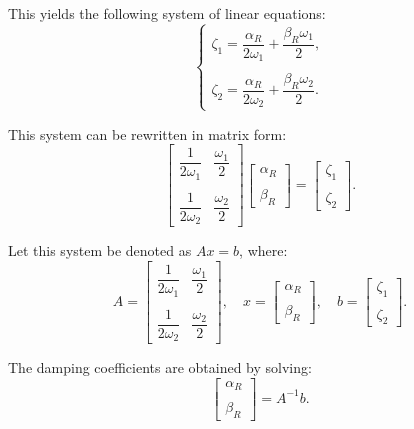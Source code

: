 \documentclass{article}
\begin{document}
	This yields the following system of linear equations:
	\[
	\begin{cases}
		\zeta_1 = \dfrac{\alpha_R}{2\omega_1} + \dfrac{\beta_R \omega_1}{2}, \\\\
		\zeta_2 = \dfrac{\alpha_R}{2\omega_2} + \dfrac{\beta_R \omega_2}{2}.
	\end{cases}
	\]
	
	This system can be rewritten in matrix form:
	\begin{equation}
		\begin{bmatrix}
			\dfrac{1}{2\omega_1} & \dfrac{\omega_1}{2} \\\\
			\dfrac{1}{2\omega_2} & \dfrac{\omega_2}{2}
		\end{bmatrix}
		\begin{bmatrix}
			\alpha_R \\\\
			\beta_R
		\end{bmatrix}
		=
		\begin{bmatrix}
			\zeta_1 \\\\
			\zeta_2
		\end{bmatrix}.
	\end{equation}
	
	Let this system be denoted as \( {A}{x} = {b} \), where:
	\[
	{A} =
	\begin{bmatrix}
		\dfrac{1}{2\omega_1} & \dfrac{\omega_1}{2} \\\\
		\dfrac{1}{2\omega_2} & \dfrac{\omega_2}{2}
	\end{bmatrix},
	\quad
	{x} =
	\begin{bmatrix}
		\alpha_R \\\\
		\beta_R
	\end{bmatrix},
	\quad
	{b} =
	\begin{bmatrix}
		\zeta_1 \\\\
		\zeta_2
	\end{bmatrix}.
	\]
	
	The damping coefficients are obtained by solving:
	\begin{equation}
		\begin{bmatrix}
			\alpha_R \\\\
			\beta_R
		\end{bmatrix}
		=
		{A}^{-1}{b}.
	\end{equation}
	
\end{document}
